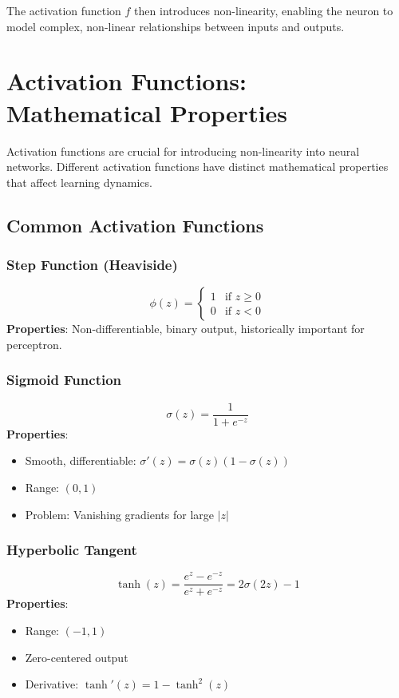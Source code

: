 The activation function \(f\) then introduces non-linearity, enabling the neuron to model complex, non-linear relationships between inputs and outputs.

\section{Activation Functions: Mathematical Properties}
Activation functions are crucial for introducing non-linearity into neural networks. Different activation functions have distinct mathematical properties that affect learning dynamics.

\subsection{Common Activation Functions}
\subsubsection{Step Function (Heaviside)}
\[\phi(z) = \begin{cases} 1 & \text{if } z \geq 0 \\ 0 & \text{if } z < 0 \end{cases}\]
\textbf{Properties}: Non-differentiable, binary output, historically important for perceptron.

\subsubsection{Sigmoid Function}
\[\sigma(z) = \frac{1}{1 + e^{-z}}\]
\textbf{Properties}:
\begin{itemize}
    \item Smooth, differentiable: \(\sigma'(z) = \sigma(z)(1 - \sigma(z))\)
    \item Range: \((0, 1)\)
    \item Problem: Vanishing gradients for large \(|z|\)
\end{itemize}

\subsubsection{Hyperbolic Tangent}
\[\tanh(z) = \frac{e^z - e^{-z}}{e^z + e^{-z}} = 2\sigma(2z) - 1\]
\textbf{Properties}:
\begin{itemize}
    \item Range: \((-1, 1)\)
    \item Zero-centered output
    \item Derivative: \(\tanh'(z) = 1 - \tanh^2(z)\)
\end{itemize}

